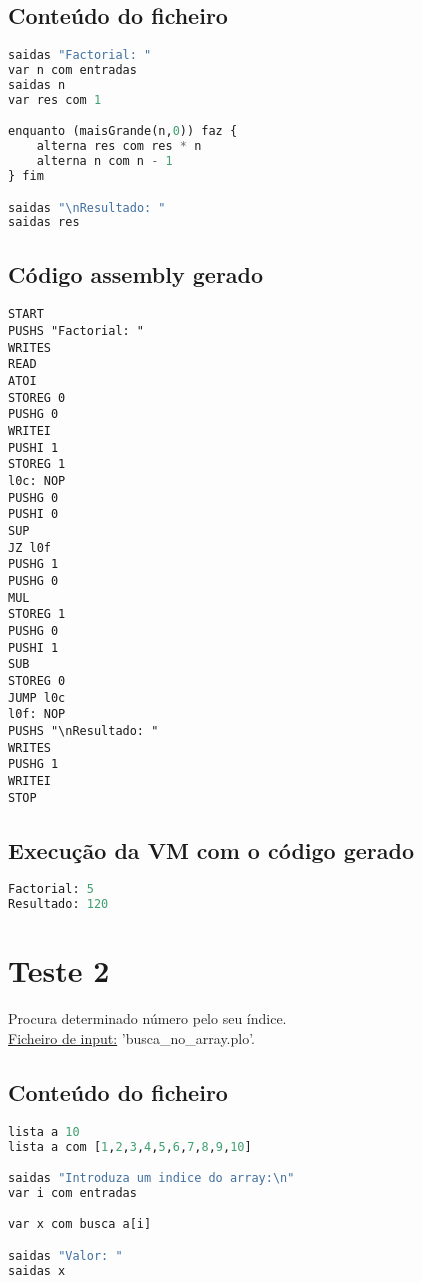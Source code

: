 \documentclass[11pt,a4paper]{report}%
\begin{document}
\subsection{Conteúdo do ficheiro}

\begin{lstlisting}[language=python]
saidas "Factorial: "
var n com entradas
saidas n
var res com 1

enquanto (maisGrande(n,0)) faz {
    alterna res com res * n
    alterna n com n - 1
} fim

saidas "\nResultado: "
saidas res
\end{lstlisting}

\subsection{Código assembly gerado}
\begin{lstlisting}[languague=Assembler]
START
PUSHS "Factorial: "
WRITES
READ
ATOI
STOREG 0
PUSHG 0
WRITEI
PUSHI 1
STOREG 1
l0c: NOP
PUSHG 0
PUSHI 0
SUP
JZ l0f
PUSHG 1
PUSHG 0
MUL
STOREG 1
PUSHG 0
PUSHI 1
SUB
STOREG 0
JUMP l0c
l0f: NOP
PUSHS "\nResultado: "
WRITES
PUSHG 1
WRITEI
STOP
\end{lstlisting}


\subsection{Execução da VM com o código gerado}
\begin{lstlisting}[language=python]
Factorial: 5
Resultado: 120
\end{lstlisting}


\section{Teste 2}
Procura determinado número pelo seu índice. \\
\underline{Ficheiro de input:} 'busca\_no\_array.plo'.

\subsection{Conteúdo do ficheiro}

\begin{lstlisting}[language=python]
lista a 10
lista a com [1,2,3,4,5,6,7,8,9,10]

saidas "Introduza um indice do array:\n"
var i com entradas

var x com busca a[i]

saidas "Valor: "
saidas x
\end{lstlisting}
\end{document}
